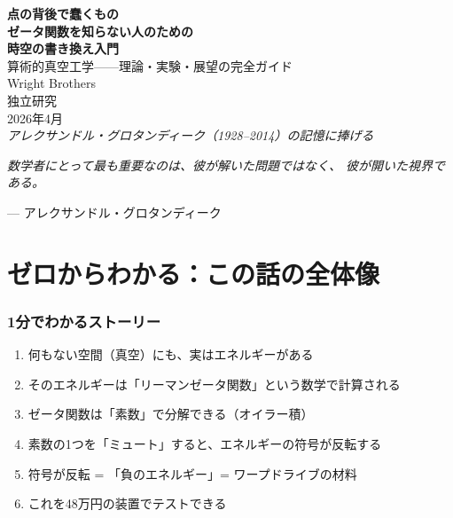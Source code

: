 \documentclass[12pt,a4paper]{article}
\begin{document}
\begin{center}
\vspace*{1cm}
{\Huge\bfseries 点の背後で蠢くもの}\\[0.8cm]
{\Large\bfseries ゼータ関数を知らない人のための}\\[0.3cm]
{\Large\bfseries 時空の書き換え入門}\\[0.5cm]
{\large 算術的真空工学——理論・実験・展望の完全ガイド}\\[2cm]
{\large Wright Brothers}\\[0.5cm]
{\normalsize 独立研究}\\[0.5cm]
{2026年4月}\\[2cm]
{\itshape アレクサンドル・グロタンディーク（1928--2014）の記憶に捧げる}
\end{center}

\newpage
\tableofcontents
\newpage

\begin{epigraph}
\textit{数学者にとって最も重要なのは、彼が解いた問題ではなく、
彼が開いた視界である。}

\hfill --- アレクサンドル・グロタンディーク
\end{epigraph}

\vspace{1cm}

\part{ゼロからわかる：この話の全体像}

\section{1分でわかるストーリー}

\begin{storybox}[この本の要約]
\begin{enumerate}
\item 何もない空間（真空）にも、実はエネルギーがある
\item そのエネルギーは「リーマンゼータ関数」という数学で計算される
\item ゼータ関数は「素数」で分解できる（オイラー積）
\item 素数の1つを「ミュート」すると、エネルギーの符号が反転する
\item 符号が反転 = 「負のエネルギー」= ワープドライブの材料
\item これを48万円の装置でテストできる
\end{enumerate}
\end{storybox}
\end{document}
